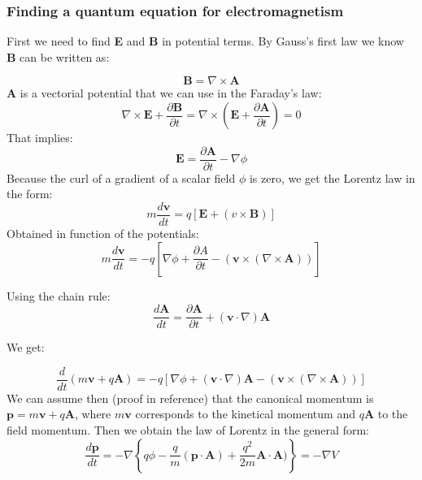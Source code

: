 \documentclass[12pt]{article}
\numberwithin{equation}{subsection}
\newcommand\page[1]{
{
}
}
\begin{document}
\page{10}
\subsubsection{Finding a quantum equation for electromagnetism}

First we need to find \textbf{E} and \textbf{B} in potential terms. By Gauss's first law we know \textbf{B} can be written as:


\begin{equation}
    \mathbf{B} = \nabla \times \mathbf{A}
\end{equation}
\textbf{A} is a vectorial potential that we can use in the Faraday's law:
\begin{equation}
    \nabla \times \mathbf{E}+\frac{\partial \mathbf B}{\partial t}=\nabla \times (\mathbf{E}+\frac{\partial \mathbf A}{\partial t})=0 
\end{equation}
That implies:
\begin{equation}
   \mathbf E = \frac{\partial\mathbf A}{\partial t} -\nabla \phi
\end{equation}
Because the curl of a gradient of a scalar field $\phi$ is zero, we get the Lorentz law in the form:
\begin{equation}
    m \frac{d\mathbf v}{dt} = q[\mathbf E + (v \times \mathbf B)]
\end{equation}
Obtained in function of the potentials:
\begin{equation}
    m \frac{d\mathbf v}{dt} = -q[\nabla \phi + \frac{\partial A}{\partial t} -(\mathbf v \times (\nabla \times \mathbf A))]
\end{equation}

Using the chain rule:
\begin{equation}
\frac{d\mathbf A}{dt} = \frac{\partial \mathbf A}{\partial t} + (\mathbf v \cdot \nabla) \mathbf A
\end{equation}
 \page{11}
 
 We get:
 
\begin{equation}
    \frac {d}{dt} (m\mathbf{v} +q \mathbf A) =  -q [\nabla \phi + (\mathbf v \cdot \nabla)\mathbf A -(\mathbf v \times (\nabla \times \mathbf A))] 
\end{equation}
We can assume then (proof in reference\cite{gross2016applied}) that the canonical momentum is $\mathbf p = m \mathbf v +q \mathbf A$, where $m\mathbf v$ corresponds to the kinetical momentum and $q\mathbf A$ to the field momentum.
Then we obtain the law of Lorentz in the general form:
\begin{equation}
    \frac{d\mathbf p}{dt} = - \nabla \left\{ q\phi- \frac{q}{m} (\mathbf p \cdot \mathbf A) + \frac{q^2}{2m} \mathbf A \cdot \mathbf A)\right\}= - \nabla V
\end{equation}
\end{document}
